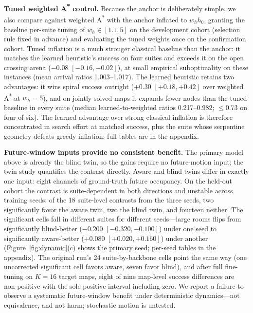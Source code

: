 \documentclass[letterpaper]{article} %
\begin{document}
\textbf{Tuned weighted A\textsuperscript{*} control.} Because the anchor is deliberately simple, we also compare against weighted A\textsuperscript{*} with the anchor inflated to $w_h h_0$, granting the baseline per-suite tuning of $w_h \in [1.1, 5]$ on the development cohort (selection rule fixed in advance) and evaluating the tuned weights once on the confirmation cohort. Tuned inflation is a much stronger classical baseline than the anchor: it matches the learned heuristic's success on four suites and exceeds it on the open crossing arena ($-0.08$ $[-0.16,-0.02]$), at small empirical suboptimality on these instances (mean arrival ratios 1.003--1.017). The learned heuristic retains two advantages: it wins spiral success outright ($+0.30$ $[+0.18,+0.42]$ over weighted A\textsuperscript{*} at $w_h{=}5$), and on jointly solved maps it expands fewer nodes than the tuned baseline in every suite (median learned-to-weighted ratios 0.217--0.982; $\leq 0.73$ on four of six). The learned advantage over strong classical inflation is therefore concentrated in search effort at matched success, plus the suite whose serpentine geometry defeats greedy inflation; full tables are in the appendix.

\textbf{Future-window inputs provide no consistent benefit.} The primary model above is already the blind twin, so the gains require no future-motion input; the twin study quantifies the contrast directly. Aware and blind twins differ in exactly one input: eight channels of ground-truth future occupancy. On the held-out cohort the contrast is suite-dependent in both directions and unstable across training seeds: of the 18 suite-level contrasts from the three seeds, two significantly favor the aware twin, two the blind twin, and fourteen neither. The significant cells fall in different suites for different seeds---large rooms flips from significantly blind-better ($-0.200$ $[-0.320,-0.100]$) under one seed to significantly aware-better ($+0.080$ $[+0.020,+0.160]$) under another (Figure~\ref{fig:dynamic}(c) shows the primary seed; per-seed tables in the appendix). The original run's 24 suite-by-backbone cells point the same way (one uncorrected significant cell favors aware, seven favor blind), and after full fine-tuning on $K{=}16$ target maps, eight of nine map-level success differences are non-positive with the sole positive interval including zero. We report a failure to observe a systematic future-window benefit under deterministic dynamics---not equivalence, and not harm; stochastic motion is untested.
\end{document}
